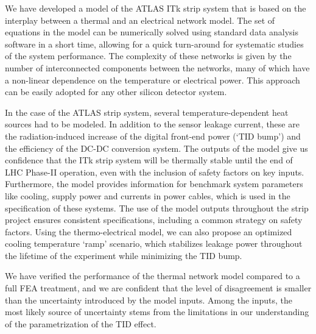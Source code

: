 We have developed a model of the ATLAS ITk strip system that is based on the interplay between a thermal and an electrical network model. The set of equations in the model can be numerically solved using standard data analysis software in a short time, allowing for a quick turn-around for systematic studies of the system performance. The complexity of these networks is given by the number of interconnected components between the networks, many of which have a non-linear dependence on the temperature or electrical power. This approach can be easily adopted for any other silicon detector system.

In the case of the ATLAS strip system, several temperature-dependent heat sources had to be modeled. In addition to the sensor leakage current, these are the  radiation-induced increase of the digital front-end power (`TID bump') and the efficiency of the DC-DC conversion system. The outputs of the model give us confidence that the ITk strip system will be thermally stable until the end of LHC Phase-II operation, even with the inclusion of safety factors on key inputs. Furthermore, the model provides information for benchmark system parameters like cooling, supply power and currents in power cables, which is used in the specification of these systems. The use of the model outputs throughout the strip project ensures consistent specifications, including a common strategy on safety factors. Using the thermo-electrical model, we can also propose an optimized cooling temperature `ramp' scenario, which stabilizes leakage power throughout the lifetime of the experiment while minimizing the TID bump.

We have verified the performance of the thermal network model compared to a full FEA treatment, and we are confident that the level of disagreement is smaller than the uncertainty introduced by the model inputs. Among the inputs, the most likely source of uncertainty stems from the limitations in our understanding of the parametrization of the TID effect.
